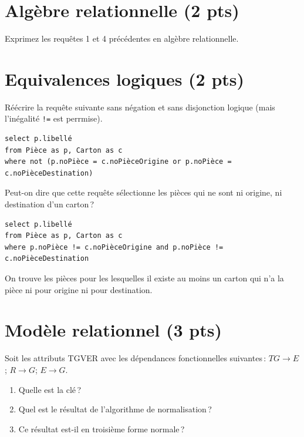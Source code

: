 \section{Algèbre relationnelle ({\bf 2 pts})}

Exprimez les requêtes 1 et 4 précédentes
en algèbre relationnelle.


\section{Equivalences logiques ({\bf 2 pts})}

Réécrire la requête suivante sans négation et sans disjonction logique
(mais l'inégalité \texttt{!=} est perrmise).


\begin{verbatim}
select p.libellé
from Pièce as p, Carton as c
where not (p.noPièce = c.noPièceOrigine or p.noPièce = c.noPièceDestination)
\end{verbatim}

Peut-on dire que cette requête sélectionne les pièces qui ne sont ni origine, ni destination
d'un carton\,?

\begin{solution}

\begin{verbatim}
select p.libellé
from Pièce as p, Carton as c
where p.noPièce != c.noPièceOrigine and p.noPièce != c.noPièceDestination
\end{verbatim}

On trouve les pièces pour les lesquelles il existe au moins un carton
qui n'a la pièce ni pour origine ni pour destination.
\end{solution}

\section{Modèle relationnel ({\bf 3 pts})}

Soit les attributs TGVER avec les dépendances fonctionnelles suivantes\,:
$TG \to E$; $R \to G$; $E \to G$.

\begin{enumerate}
  \item Quelle est la clé\,?
  \item Quel est le résultat de l'algorithme de normalisation\,?
  \item Ce résultat est-il en troisième forme normale\,?
\end{enumerate}



